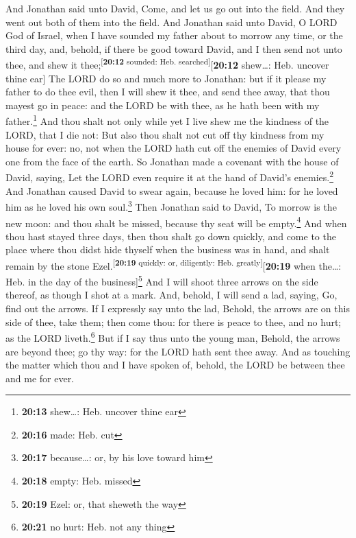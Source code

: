  And Jonathan said unto David, Come, and let us go out
into the field. And they went out both of them into the field.
 And Jonathan said unto David, O LORD God of Israel, when
I have sounded my father about to morrow any time, or the third day,
and, behold, if there be good toward David, and I then send not unto
thee, and shew it thee;\textsuperscript{{[}\textbf{20:12} sounded: Heb.
searched{]}}{[}\textbf{20:12} shew\ldots: Heb. uncover thine ear{]}
 The LORD do so and much more to Jonathan: but if it
please my father to do thee evil, then I will shew it thee, and send
thee away, that thou mayest go in peace: and the LORD be with thee, as
he hath been with my father.\footnote{\textbf{20:13} shew\ldots: Heb.
  uncover thine ear}  And thou shalt not only while yet I
live shew me the kindness of the LORD, that I die not: 
But also thou shalt not cut off thy kindness from my house for ever: no,
not when the LORD hath cut off the enemies of David every one from the
face of the earth.  So Jonathan made a covenant with the
house of David, saying, Let the LORD even require it at the hand of
David's enemies.\footnote{\textbf{20:16} made: Heb. cut} 
And Jonathan caused David to swear again, because he loved him: for he
loved him as he loved his own soul.\footnote{\textbf{20:17}
  because\ldots: or, by his love toward him}  Then
Jonathan said to David, To morrow is the new moon: and thou shalt be
missed, because thy seat will be empty.\footnote{\textbf{20:18} empty:
  Heb. missed}  And when thou hast stayed three days,
then thou shalt go down quickly, and come to the place where thou didst
hide thyself when the business was in hand, and shalt remain by the
stone Ezel.\textsuperscript{{[}\textbf{20:19} quickly: or, diligently:
Heb. greatly{]}}{[}\textbf{20:19} when the\ldots: Heb. in the day of the
business{]}\footnote{\textbf{20:19} Ezel: or, that sheweth the way}
 And I will shoot three arrows on the side thereof, as
though I shot at a mark.  And, behold, I will send a lad,
saying, Go, find out the arrows. If I expressly say unto the lad,
Behold, the arrows are on this side of thee, take them; then come thou:
for there is peace to thee, and no hurt; as the LORD liveth.\footnote{\textbf{20:21}
  no hurt: Heb. not any thing}  But if I say thus unto
the young man, Behold, the arrows are beyond thee; go thy way: for the
LORD hath sent thee away.  And as touching the matter
which thou and I have spoken of, behold, the LORD be between thee and me
for ever.

